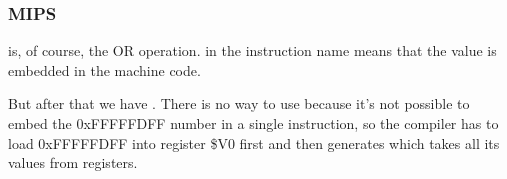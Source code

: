﻿\subsubsection{MIPS}




 is, of course, the OR operation.  in the instruction name means that the value is embedded in the machine code.


But after that we have \AND. There is no way to use  because it's not possible to embed the 0xFFFFFDFF number
in a single instruction, so the compiler has to load 0xFFFFFDFF into register \$V0 first and then generates
\AND which takes all its values from registers.
